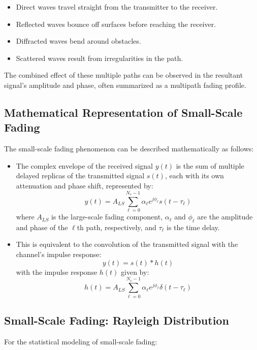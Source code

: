 \begin{itemize}
    \item Direct waves travel straight from the transmitter to the receiver.
    \item Reflected waves bounce off surfaces before reaching the receiver.
    \item Diffracted waves bend around obstacles.
    \item Scattered waves result from irregularities in the path.
\end{itemize}

The combined effect of these multiple paths can be observed in the resultant signal's amplitude and phase, often summarized as a multipath fading profile.


\subsection*{Mathematical Representation of Small-Scale Fading}

The small-scale fading phenomenon can be described mathematically as follows:

\begin{itemize}
    \item The complex envelope of the received signal \( y(t) \) is the sum of multiple delayed replicas of the transmitted signal \( s(t) \), each with its own attenuation and phase shift, represented by:
    \[
    y(t) = A_{LS} \sum_{\ell=0}^{N_c-1} \alpha_{\ell} e^{j\phi_{\ell}} s(t - \tau_{\ell})
    \]
    where \( A_{LS} \) is the large-scale fading component, \( \alpha_{\ell} \) and \( \phi_{\ell} \) are the amplitude and phase of the \(\ell\)th path, respectively, and \( \tau_{\ell} \) is the time delay.
    
    \item This is equivalent to the convolution of the transmitted signal with the channel's impulse response:
    \[
    y(t) = s(t) \ast h(t)
    \]
    with the impulse response \( h(t) \) given by:
    \[
    h(t) = A_{LS} \sum_{\ell=0}^{N_c-1} \alpha_{\ell} e^{j\phi_{\ell}} \delta(t - \tau_{\ell})
    \]
\end{itemize}

\subsection*{Small-Scale Fading: Rayleigh Distribution}

For the statistical modeling of small-scale fading:


